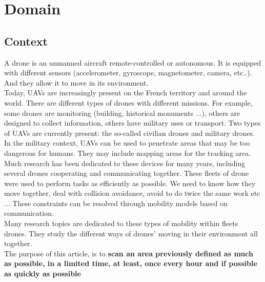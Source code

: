 \part{Domain}

\chapter{Context}

A drone is an unmanned aircraft remote-controlled or autonomous. It is equipped with different sensors (accelerometer, gyroscope, magnetometer, camera, etc..). And they allow it to move in its environment.\\

Today, UAVs are increasingly present on the French territory and around the world. There are different types of drones with different missions. For example, some drones are monitoring (building, historical monuments ...), others are designed to collect information, others have military uses or transport. Two types of UAVs are currently present: the so-called civilian drones and military drones. In the military context, UAVs can be used to penetrate areas that may be too dangerous for humans. They may include mapping areas for the tracking area.\\

Much research has been dedicated to these devices for many years, including several drones cooperating and communicating together. These fleets of drone were used to perform tasks as efficiently as possible. We need to know how they move together, deal with collision avoidance, avoid to do twice the same work etc ... These constraints can be resolved through mobility models based on communication.\\
Many research topics are dedicated to these types of mobility within fleets drones. They study the different ways of drones' moving in their environment all together.\\

The purpose of this article, is to \textbf{scan an area previously defined as much as possible, in a limited time, at least, once every hour and if possible as quickly as possible}